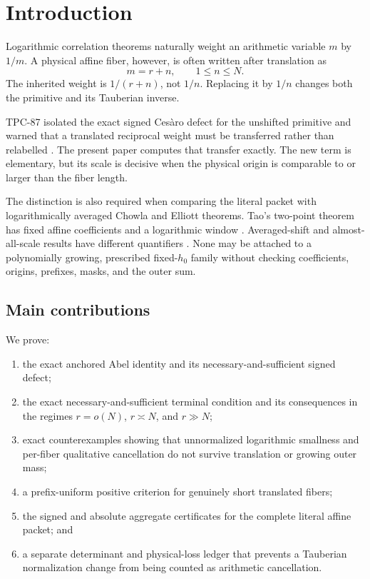 \section{Introduction}
\label{sec:introduction}

Logarithmic correlation theorems naturally weight an arithmetic
variable \(m\) by \(1/m\).  A physical affine fiber, however, is often
written after translation as
\[
 m=r+n,\qquad 1\le n\le N.
\]
The inherited weight is \(1/(r+n)\), not \(1/n\).  Replacing it by
\(1/n\) changes both the primitive and its Tauberian inverse.

TPC-87 isolated the exact signed Ces\`aro defect for the unshifted
primitive and warned that a translated reciprocal weight must be
transferred rather than relabelled \citep{WangTPC87}.  The present
paper computes that transfer exactly.  The new term is elementary,
but its scale is decisive when the physical origin is comparable to
or larger than the fiber length.

The distinction is also required when comparing the literal packet
with logarithmically averaged Chowla and Elliott theorems.  Tao's
two-point theorem has fixed affine coefficients and a logarithmic
window \citep{Tao2016LogChowla}.  Averaged-shift and almost-all-scale
results have different quantifiers
\citep{MatomakiRadziwillTao2015,TaoTeravainen2019}.  None may be
attached to a polynomially growing, prescribed fixed-\(h_0\) family
without checking coefficients, origins, prefixes, masks, and the
outer sum.

\subsection{Main contributions}

We prove:
\begin{enumerate}[label=\textup{(\roman*)},leftmargin=2.5em]
\item the exact anchored Abel identity and its necessary-and-sufficient
  signed defect;
\item the exact necessary-and-sufficient terminal condition and its
  consequences in the regimes \(r=o(N)\), \(r\asymp N\), and
  \(r\gg N\);
\item exact counterexamples showing that unnormalized logarithmic
  smallness and per-fiber qualitative cancellation do not survive
  translation or growing outer mass;
\item a prefix-uniform positive criterion for genuinely short
  translated fibers;
\item the signed and absolute aggregate certificates for the complete
  literal affine packet; and
\item a separate determinant and physical-loss ledger that prevents
  a Tauberian normalization change from being counted as arithmetic
  cancellation.
\end{enumerate}

